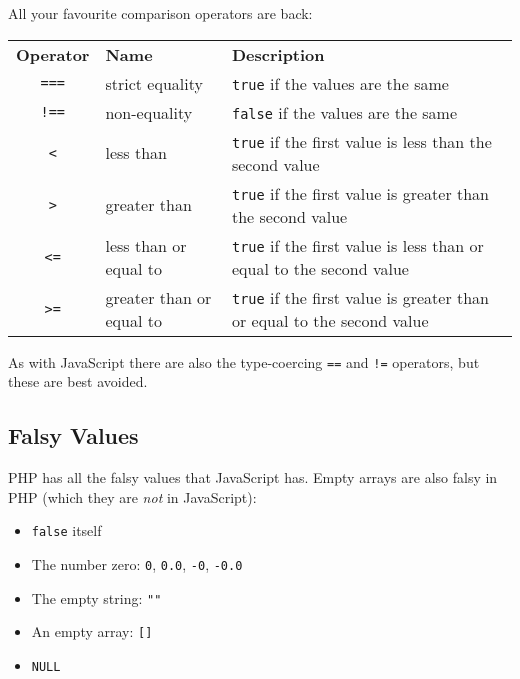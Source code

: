 All your favourite comparison operators are back:
\\

\begin{small}
    \begin{tabularx}{\textwidth}{c l X}
        \textbf{Operator} & \textbf{Name} & \textbf{Description} \\
        \texttt{===} & strict equality & \texttt{true} if the values are the same \\
        \texttt{!==} & non-equality & \texttt{false} if the values are the same\\
        \texttt{<} & less than & \texttt{true} if the first value is less than the second value  \\
        \texttt{>} & greater than & \texttt{true} if the first value is greater than the second value\\
        \texttt{<=} & less than or equal to & \texttt{true} if the first value is less than or equal to the second value  \\
        \texttt{>=} & greater than or equal to & \texttt{true} if the first value is greater than or equal to the second value
    \end{tabularx}
\end{small}

\par\bigskip

As with JavaScript there are also the type-coercing \texttt{==} and \texttt{!=} operators, but these are best avoided.


\subsection{Falsy Values}

PHP has all the falsy values that JavaScript has. Empty arrays are also falsy in PHP (which they are \textit{not} in JavaScript):

\begin{itemize}
    \item \texttt{false} itself
    \item The number zero: \texttt{0}, \texttt{0.0}, \texttt{-0}, \texttt{-0.0}
    \item The empty string: \texttt{""}
    \item An empty array: \texttt{[]}
    \item \texttt{NULL}
\end{itemize}



